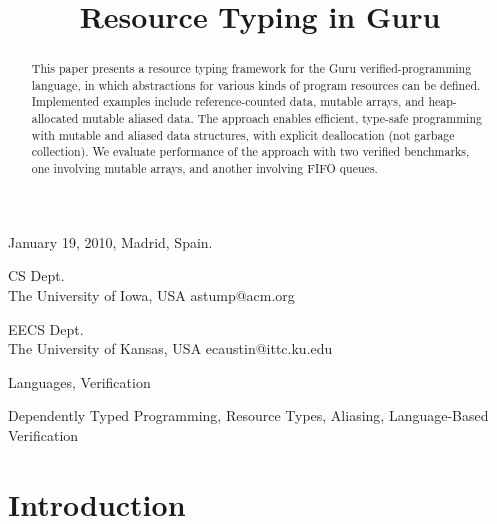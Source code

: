 \documentclass[9pt,natbib]{sigplanconf}
\begin{document}
 {January 19, 2010, Madrid, Spain.}


\title{Resource Typing in Guru}

{CS Dept.\\ The University of Iowa, USA}
{astump@acm.org}

{EECS Dept.\\ The University of Kansas, USA}
{ecaustin@ittc.ku.edu}

\maketitle


\begin{abstract}
This paper presents a resource typing framework for the Guru
verified-programming language, in which abstractions for various kinds
of program resources can be defined.  Implemented examples include
reference-counted data, mutable arrays, and heap-allocated mutable
aliased data.  The approach enables efficient, type-safe programming
with mutable and aliased data structures, with explicit deallocation
(not garbage collection).  We evaluate performance of the approach
with two verified benchmarks, one involving mutable arrays, and
another involving FIFO queues.
\end{abstract}


\terms
Languages, Verification

\keywords
Dependently Typed Programming, Resource Types, Aliasing, Language-Based Verification

\section{Introduction}
\end{document}
